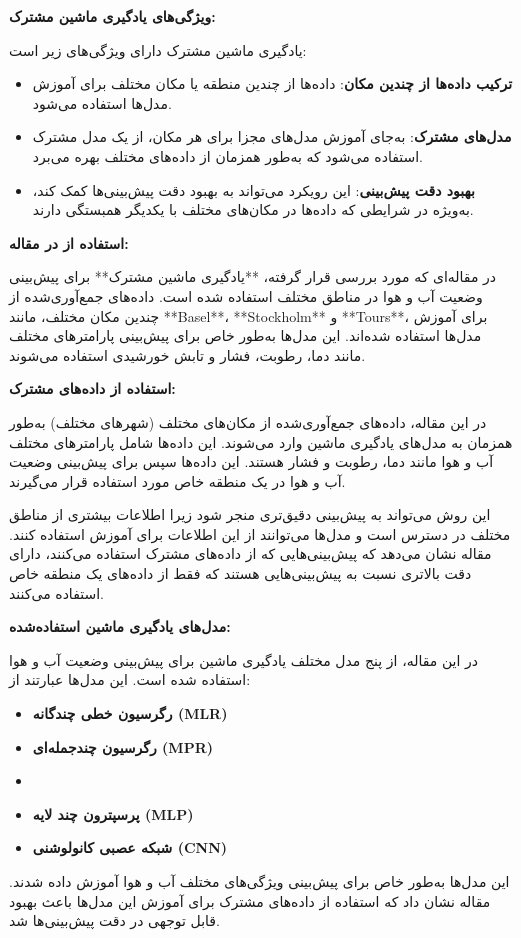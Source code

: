 \documentclass{article}
\begin{document}
\textbf{ویژگی‌های یادگیری ماشین مشترک:}

یادگیری ماشین مشترک دارای ویژگی‌های زیر است:
\begin{itemize}
    \item \textbf{ترکیب داده‌ها از چندین مکان}: داده‌ها از چندین منطقه یا مکان مختلف برای آموزش مدل‌ها استفاده می‌شود.
    \item \textbf{مدل‌های مشترک}: به‌جای آموزش مدل‌های مجزا برای هر مکان، از یک مدل مشترک استفاده می‌شود که به‌طور همزمان از داده‌های مختلف بهره می‌برد.
    \item \textbf{بهبود دقت پیش‌بینی}: این رویکرد می‌تواند به بهبود دقت پیش‌بینی‌ها کمک کند، به‌ویژه در شرایطی که داده‌ها در مکان‌های مختلف با یکدیگر همبستگی دارند.
\end{itemize}

\textbf{استفاده از  در مقاله:}

در مقاله‌ای که مورد بررسی قرار گرفته، **یادگیری ماشین مشترک** برای پیش‌بینی وضعیت آب و هوا در مناطق مختلف استفاده شده است. داده‌های جمع‌آوری‌شده از چندین مکان مختلف، مانند **Basel**، **Stockholm** و **Tours**، برای آموزش مدل‌ها استفاده شده‌اند. این مدل‌ها به‌طور خاص برای پیش‌بینی پارامترهای مختلف مانند دما، رطوبت، فشار و تابش خورشیدی استفاده می‌شوند.

\textbf{استفاده از داده‌های مشترک:}

در این مقاله، داده‌های جمع‌آوری‌شده از مکان‌های مختلف (شهرهای مختلف) به‌طور همزمان به مدل‌های یادگیری ماشین وارد می‌شوند. این داده‌ها شامل پارامترهای مختلف آب و هوا مانند دما، رطوبت و فشار هستند. این داده‌ها سپس برای پیش‌بینی وضعیت آب و هوا در یک منطقه خاص مورد استفاده قرار می‌گیرند.

این روش می‌تواند به پیش‌بینی دقیق‌تری منجر شود زیرا اطلاعات بیشتری از مناطق مختلف در دسترس است و مدل‌ها می‌توانند از این اطلاعات برای آموزش استفاده کنند. مقاله نشان می‌دهد که پیش‌بینی‌هایی که از داده‌های مشترک استفاده می‌کنند، دارای دقت بالاتری نسبت به پیش‌بینی‌هایی هستند که فقط از داده‌های یک منطقه خاص استفاده می‌کنند.

\textbf{مدل‌های یادگیری ماشین استفاده‌شده:}

در این مقاله، از پنج مدل مختلف یادگیری ماشین برای پیش‌بینی وضعیت آب و هوا استفاده شده است. این مدل‌ها عبارتند از:
\begin{itemize}
    \item \textbf{رگرسیون خطی چندگانه (MLR)}
    \item \textbf{رگرسیون چندجمله‌ای (MPR)}
    \item \textbf{}
    \item \textbf{پرسپترون چند لایه (MLP)}
    \item \textbf{شبکه عصبی کانولوشنی (CNN)}
\end{itemize}
این مدل‌ها به‌طور خاص برای پیش‌بینی ویژگی‌های مختلف آب و هوا آموزش داده شدند. مقاله نشان داد که استفاده از داده‌های مشترک برای آموزش این مدل‌ها باعث بهبود قابل توجهی در دقت پیش‌بینی‌ها شد.
\end{document}
